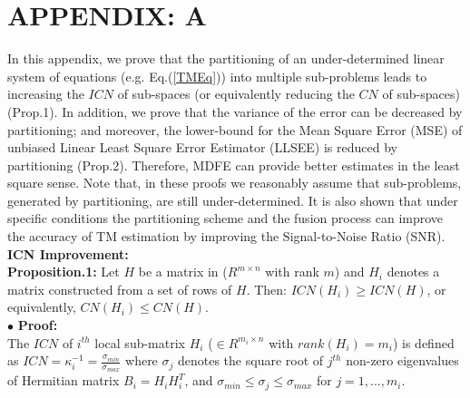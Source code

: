 \def\appendix{\par
\section*{APPENDIX: A}} \label{AppA}
\appendix{}

In this appendix, we prove that the partitioning of an under-determined linear system of equations (e.g. Eq.(\ref{TMEq})) into multiple sub-problems leads to increasing the $ICN$ of sub-spaces (or equivalently reducing the $CN$ of sub-spaces) (Prop.1). In addition, we prove that the variance of the error can be decreased by partitioning; and moreover, the lower-bound for the Mean Square Error (MSE) of unbiased Linear Least Square Error Estimator (LLSEE) is reduced by partitioning (Prop.2). Therefore, MDFE can provide better estimates in the least square sense. Note that, in these proofs we reasonably assume that sub-problems, generated by partitioning, are still under-determined. It is also shown that under specific conditions the partitioning scheme and the fusion process can improve the accuracy of TM estimation by improving the Signal-to-Noise Ratio (SNR).\\

{\bf ICN Improvement:} \\

\textbf{Proposition.1:} Let $H$ be a matrix in ($ R^{m\times n}$ with rank $m$) and $H_{i}$ denotes a matrix constructed from a set of rows of $H$. Then: $ICN(H_{i})\geq ICN(H)$, or equivalently, $CN(H_{i})\leq CN(H)$.\\

$\bullet$ \textbf{Proof:}\\

The $ICN$ of $i^{th}$ local sub-matrix $H_{i}$ ($\in R^{m_{i}\times n}$ with $rank(H_{i})=m_{i}$) is defined as $ICN=\kappa^{-1}_{i}=\frac{\sigma_{min}}{\sigma_{max}}$ where $\sigma_{j}$ denotes the square root of $j^{th}$ non-zero eigenvalues of Hermitian matrix $B_{i} = H_{i}H_{i}^{T}$, and $\sigma_{min}\leq \sigma_{j} \leq \sigma_{max}$ for $j=1,...,m_{i}$.

